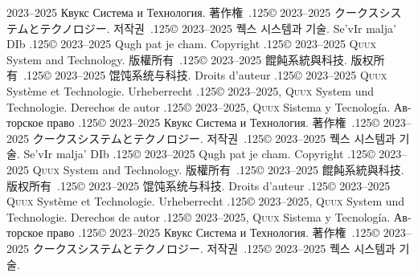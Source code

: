 \documentclass{cookbook}
\begin{document}
{{{	2023–2025 \foreignlanguage{russian}{Квукс Система и Технология.}
著作権~{\lower.125\baselineskip\hbox{\copyright}}
	2023--2025 クークスシステムとテクノロジー.
저작권~{\lower.125\baselineskip\hbox{\copyright}}
	2023--2025 퀙스 시스템과 기술.
Se'vIr malja' DIb {\lower.125\baselineskip\hbox{\copyright}} %
	2023--2025 Qugh pat je cham.
Copyright {\lower.125\baselineskip\hbox{\copyright}}
	2023--2025 \textsc{Quux} System and Technology.
版權所有~{\lower.125\baselineskip\hbox{\copyright}}
	2023--2025 餛飩系統與科技.
版权所有~{\lower.125\baselineskip\hbox{\copyright}}
	2023--2025 馄饨系统与科技.
Droits d'auteur {\lower.125\baselineskip\hbox{\copyright}} %
	2023--2025 \textsc{Quux} Système et Technologie.
Urheberrecht {\lower.125\baselineskip\hbox{\copyright}} %
	2023--2025, \textsc{Quux} System und Technologie.
Derechos de autor {\lower.125\baselineskip\hbox{\copyright}} %
	2023--2025, \textsc{Quux} Sistema y Tecnología.
\foreignlanguage{russian}{Авторское право} %
	{\lower.125\baselineskip\hbox{\copyright}}
	2023–2025 \foreignlanguage{russian}{Квукс Система и Технология.}
著作権~{\lower.125\baselineskip\hbox{\copyright}}
	2023--2025 クークスシステムとテクノロジー.
저작권~{\lower.125\baselineskip\hbox{\copyright}}
	2023--2025 퀙스 시스템과 기술.
Se'vIr malja' DIb {\lower.125\baselineskip\hbox{\copyright}} %
	2023--2025 Qugh pat je cham.
Copyright {\lower.125\baselineskip\hbox{\copyright}}
	2023--2025 \textsc{Quux} System and Technology.
版權所有~{\lower.125\baselineskip\hbox{\copyright}}
	2023--2025 餛飩系統與科技.
版权所有~{\lower.125\baselineskip\hbox{\copyright}}
	2023--2025 馄饨系统与科技.
Droits d'auteur {\lower.125\baselineskip\hbox{\copyright}} %
	2023--2025 \textsc{Quux} Système et Technologie.
Urheberrecht {\lower.125\baselineskip\hbox{\copyright}} %
	2023--2025, \textsc{Quux} System und Technologie.
Derechos de autor {\lower.125\baselineskip\hbox{\copyright}} %
	2023--2025, \textsc{Quux} Sistema y Tecnología.
\foreignlanguage{russian}{Авторское право} %
	{\lower.125\baselineskip\hbox{\copyright}}
	2023–2025 \foreignlanguage{russian}{Квукс Система и Технология.}
著作権~{\lower.125\baselineskip\hbox{\copyright}}
	2023--2025 クークスシステムとテクノロジー.
저작권~{\lower.125\baselineskip\hbox{\copyright}}
	2023--2025 퀙스 시스템과 기술.
}}}
\end{document}
